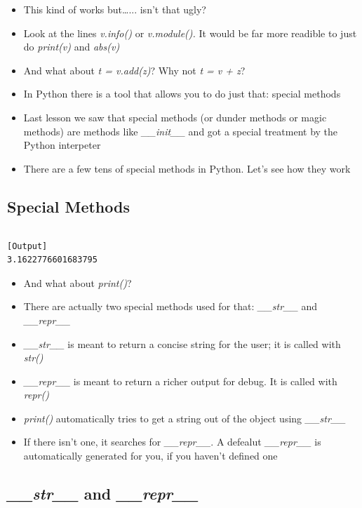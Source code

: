   \begin{itemize}
    \item This kind of works but\dots... isn't that ugly?
    \item Look at the lines \emph{v.info()} or \emph{v.module().}
          It would be far more readible to just do \emph{print(v)} and \emph{abs(v)}
    \item And what about \emph{t = v.add(z)}? Why not \emph{t = v + z}?
    \item In Python there is a tool that allows you to do just that: \alert{special methods}
    \item Last lesson we saw that special methods (or dunder methods or 
          magic methods) are methods like \emph{\_\_init\_\_} and got a special
          treatment by the Python interpeter
    \item There are a few tens of special methods in Python. Let's see how they work
  \end{itemize}

\subsection{Special Methods}


\inputminted{python}{snippets/vector2d_2.py}
\begin{verbatim}
[Output]
3.1622776601683795
\end{verbatim}

  \begin{itemize}
    \item And what about \emph{print()}?
    \item There are actually two special methods used for that: \emph{\_\_str\_\_} and \emph{\_\_repr\_\_}
    \item \emph{\_\_str\_\_} is meant to return a concise string for the user; it is called with \emph{str()}
    \item \emph{\_\_repr\_\_} is meant to return a richer output for debug. It is called with \emph{repr()}
    \item \emph{print()} automatically tries to get a string out of the object using \emph{\_\_str\_\_}
    \item If there isn't one, it searches for \emph{\_\_repr\_\_}. A defealut \emph{\_\_repr\_\_}
          is automatically generated for you, if you haven't defined one
  \end{itemize}

\subsection{\emph{\_\_str\_\_} and \emph{\_\_repr\_\_}}


